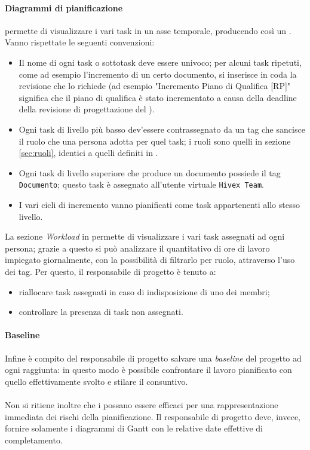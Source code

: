 \paragraph{Diagrammi di pianificazione}
 permette di visualizzare i vari task in un asse temporale, producendo così un . 
Vanno rispettate le seguenti convenzioni:
\begin{itemize}
	\item Il nome di ogni task o sottotask deve essere univoco; per alcuni task ripetuti, come ad esempio l'incremento di un certo documento, si inserisce in coda la revisione che lo richiede (ad esempio "Incremento Piano di Qualifica [RP]" significa che il piano di qualifica è stato incrementato a causa della deadline della revisione di progettazione del \TV).
	\item Ogni task di livello più basso dev'essere contrassegnato da un tag che sancisce il ruolo che una persona adotta per quel task; i ruoli sono quelli in sezione \ref{sec:ruoli}, identici a quelli definiti in \PdP.
	\item Ogni task di livello superiore che produce un documento possiede il tag \texttt{Documento}; questo task è assegnato all'utente virtuale \texttt{Hivex Team}.
	\item I vari cicli di incremento vanno pianificati come task appartenenti allo stesso livello.
\end{itemize}
La sezione \emph{Workload} in  permette di visualizzare i vari task assegnati ad ogni persona; grazie a questo si può analizzare il quantitativo di ore di lavoro impiegato giornalmente, con la possibilità di filtrarlo per ruolo, attraverso l'uso dei tag. Per questo, il responsabile di progetto è tenuto a:
\begin{itemize}
	\item riallocare task assegnati in caso di indisposizione di uno dei membri;
	\item controllare la presenza di task non assegnati.
\end{itemize}

\paragraph{Baseline} Infine è compito del responsabile di progetto salvare una \emph{baseline} del progetto ad ogni  raggiunta: in questo modo è possibile confrontare il lavoro pianificato con quello effettivamente svolto e stilare il consuntivo.

\paragraph{} Non si ritiene inoltre che i  possano essere efficaci per una rappresentazione immediata dei rischi della pianificazione. Il responsabile di progetto deve, invece, fornire solamente i diagrammi di Gantt con le relative date effettive di completamento.




